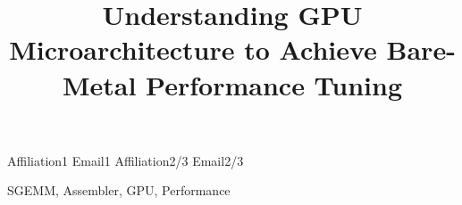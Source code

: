 \documentclass[9pt, numbers]{sigplanconf}
\begin{document}






\title{Understanding GPU Microarchitecture to Achieve Bare-Metal Performance Tuning}
\subtitle{}


           {Affiliation1}
           {Email1}
           {Affiliation2/3}
           {Email2/3}

\maketitle




\keywords
SGEMM, Assembler, GPU, Performance








%
%




\newpage
\newpage
\pagebreak

\appendix

\end{document}
